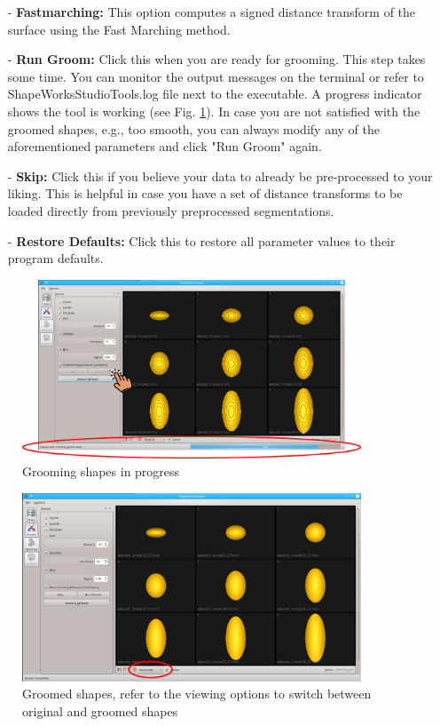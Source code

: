 \documentclass[letterpaper,12pt]{article}   %
\begin{document}
\begin{itemize}
\item[-] \textbf{Fastmarching:} This option computes a signed distance transform of the surface using the Fast Marching method.
\item[-] \textbf{Run Groom:} Click this when you are ready for grooming. This step takes some time. You can monitor the output messages on the terminal or refer to ShapeWorksStudioTools.log file next to the executable. A progress indicator shows the tool is working (see Fig. \ref{fig:grooming}). In case you are not satisfied with the groomed shapes, e.g., too smooth, you can always modify any of the aforementioned parameters and click "Run Groom" again.
\item[-] \textbf{Skip:} Click this if you believe your data to already be pre-processed to your liking. This is helpful in case you have a set of distance transforms to be loaded directly from previously preprocessed segmentations.
\item[-] \textbf{Restore Defaults:} Click this to restore all parameter values to their program defaults. 
\end{itemize}

\begin{figure}[!htp]
	\centering
	\includegraphics[width=0.9\textwidth]{figs_v2/grooming.png}
	\caption{Grooming shapes in progress }
	\label{fig:grooming}
\end{figure}

\begin{figure}[!htp]
	\centering
	\includegraphics[width=0.9\textwidth]{figs_v2/groomed.png}
	\caption{Groomed shapes, refer to the viewing options to switch between original and groomed shapes}
	\label{fig:groomed}
\end{figure}
\end{document}

